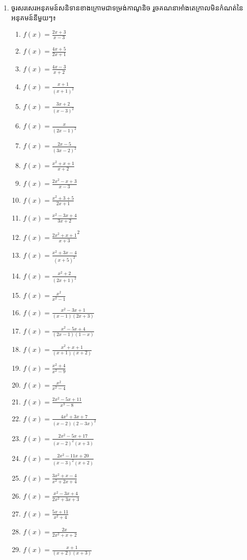 \documentclass[12pt,a4paper]{article}
\begin{document}
		\begin{enumerate}[I]
			 \item ចូរសរសេរអនុគមន៍សនិទានខាងក្រោមជាទម្រង់កាណូនិច រួចគណនាអាំងតេក្រាលមិនកំណត់នៃអនុគមន៍នីមួយៗ៖
		\begin{multicols}{3}
			\begin{enumerate}[1]
				\item $f(x)=\frac{2x+3}{x-3}$
				\item $f(x)=\frac{4x+5}{2x+1}$
				\item $f(x)=\frac{4x-3}{x+2}$
				\item $f(x)=\frac{x+1}{(x+1)^2}$
				\item $f(x)=\frac{3x+2}{(x-3)^2}$
				\item $f(x)=\frac{x}{(2x-1)^2}$
				\item $f(x)=\frac{2x-5}{(3x-2)^2}$
				\item $f(x)=\frac{x^2+x+1}{x+2}$
				\item $f(x)=\frac{2x^2-x+3}{x-3}$
				\item $f(x)=\frac{x^2+3+5}{2x+1}$
				\item $f(x)=\frac{x^2-3x+4}{3x+2}$
				\item $f(x)=\frac{2x^2+x+1}{x+3}^2$
				\item $f(x)=\frac{x^2+3x-4}{(x+5)^2}$
				\item $f(x)=\frac{x^2+2}{(2x+1)^2}$
				\item $f(x)=\frac{x^2}{x^2-1}$
				\item $f(x)=\frac{x^2-3x+1}{(x-1)(2x+3)}$
				\item $f(x)=\frac{x^2-5x+4}{(2x-1)(1-x)}$
				\item $f(x)=\frac{x^2+x+1}{(x+1)(x+2)}$
				\item $f(x)=\frac{x^2+4}{x^2-9}$
				\item $f(x)=\frac{x^2}{x^2-4}$
				\item $f(x)=\frac{2x^2-5x+11}{x^3-8}$
				\item $f(x)=\frac{4x^2+3x+7}{(x-2)(2-3x)^2}$
				\item $f(x)=\frac{2x^2-5x+17}{(x-2)^2(x+3)}$
				\item $f(x)=\frac{2x^2-11x+20}{(x-3)^2(x+2)}$
				\item $f(x)=\frac{3x^2+x-4}{x^2+2x+4}$
				\item $f(x)=\frac{x^2-3x+4}{2x^2+3x+3}$
				\item $f(x)=\frac{5x+11}{x^2+4}$
				\item $f(x)=\frac{2x}{2x^2+x+2}$
				\item $f(x)=\frac{x+1}{(x+2)(x+3)}$

\end{enumerate}
\end{multicols}
\end{enumerate}
\end{document}
